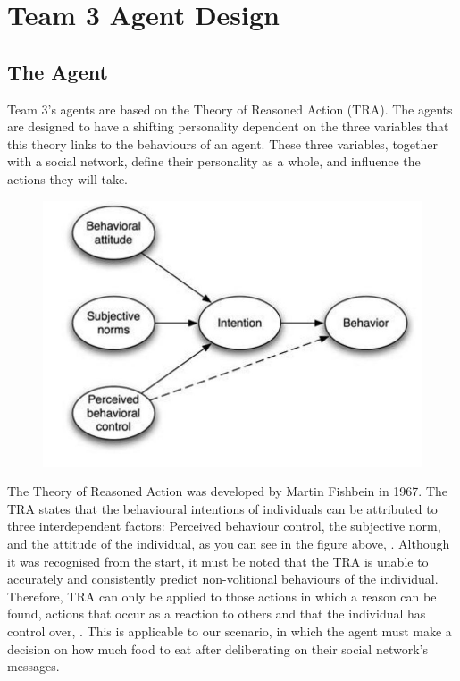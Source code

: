 \chapter{Team 3 Agent Design}\label{team_3_agent_design}

\section{The Agent}\label{sec:the_agent}
Team 3’s agents are based on the Theory of Reasoned Action (TRA). The agents are designed to have a shifting personality dependent on the three variables that this theory links to the behaviours of an agent. These three variables, together with a social network, define their personality as a whole, \cite{victor} and influence the actions they will take.\par
\begin{figure}[htb]
    \centering
    \includegraphics[width=1\linewidth]{005_team_3_agent_design/images/image1.jpg}
    \label{fig:TRA-diagram}
\end{figure}
The Theory of Reasoned Action was developed by Martin Fishbein in 1967. The TRA states that the behavioural intentions of individuals can be attributed to three interdependent factors: Perceived behaviour control, the subjective norm, and the attitude of the individual, as you can see in the figure above, \cite{norazalan}. Although it was recognised from the start, it must be noted that the TRA is unable to accurately and consistently predict non-volitional behaviours of the individual. Therefore, TRA can only be applied to those actions in which a reason can be found, actions that occur as a reaction to others and that the individual has control over, \cite{TRA}. This is applicable to our scenario, in which the agent must make a decision on how much food to eat after deliberating on their social network’s messages. \par
